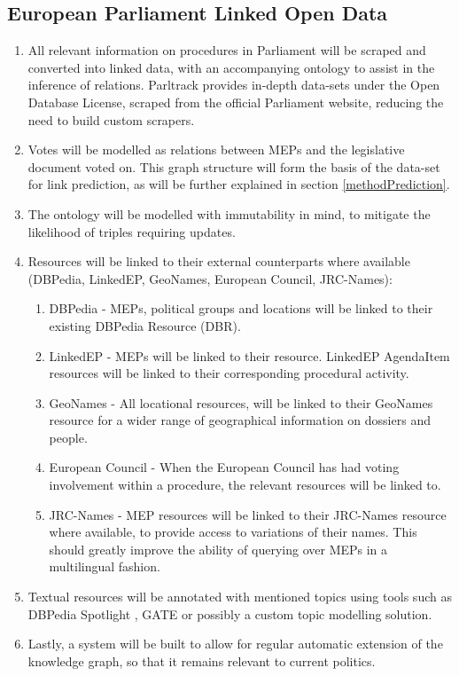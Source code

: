 \documentclass{article}
\begin{document}
\subsection{European Parliament Linked Open Data} \label{methodLOD}
\begin{enumerate}
    \item All relevant information on procedures in Parliament will be scraped and converted into linked data, with an accompanying ontology to assist in the inference of relations. Parltrack provides in-depth data-sets \cite{parltrackSchema} under the Open Database License, scraped from the official Parliament website, reducing the need to build custom scrapers.
    \item Votes will be modelled as relations between MEPs and the legislative document voted on. This graph structure will form the basis of the data-set for link prediction, as will be further explained in section \ref{methodPrediction}.
    \item The ontology will be modelled with immutability in mind, to mitigate the likelihood of triples requiring updates.
    \item Resources will be linked to their external counterparts where available (DBPedia, LinkedEP, GeoNames, European Council, JRC-Names):
    \begin{enumerate}
        \item DBPedia - MEPs, political groups and locations will be linked to their existing DBPedia Resource (DBR).
        \item LinkedEP - MEPs will be linked to their resource. LinkedEP AgendaItem resources will be linked to their corresponding procedural activity.
        \item GeoNames - All locational resources, will be linked to their GeoNames resource for a wider range of geographical information on dossiers and people.
        \item European Council - When the European Council has had voting involvement within a procedure, the relevant resources will be linked to.
        \item JRC-Names \cite{Ehrmann2017JRCNamesME} - MEP resources will be linked to their JRC-Names resource where available, to provide access to variations of their names. This should greatly improve the ability of querying over MEPs in a multilingual fashion.
    \end{enumerate}
    \item Textual resources will be annotated with mentioned topics using tools such as DBPedia Spotlight \cite{isem2013daiber}, GATE \cite{Cunningham2002GATEA} or possibly a custom topic modelling solution.
    \item Lastly, a system will be built to allow for regular automatic extension of the knowledge graph, so that it remains relevant to current politics.
\end{enumerate}
\end{document}
